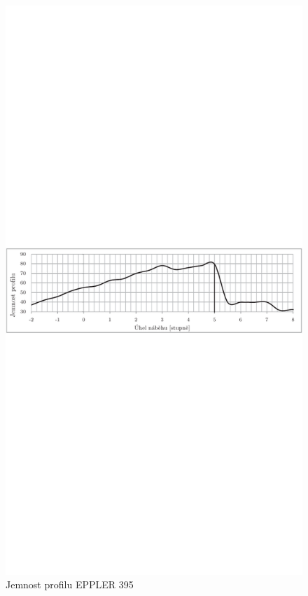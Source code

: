 		\begin{figure}[H]
				\centering
				\includegraphics[]{obrazky/grafy/eppjp}
				\caption{Jemnost profilu EPPLER 395}
				\label{profil:eppj}
		\end{figure}
